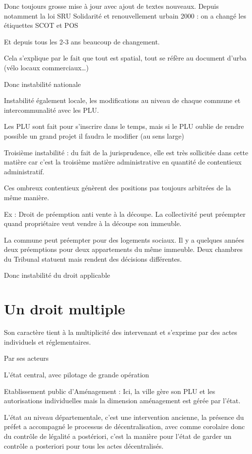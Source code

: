 		Donc toujours grosse mise à jour avec ajout de textes nouveaux. Depuis notamment la loi SRU Solidarité et renouvellement urbain 2000 : on a changé les étiquettes SCOT et POS

		Et depuis tous les 2-3 ans beaucoup de changement.

		Cela s’explique par le fait que tout est spatial, tout se réfère au document d’urba (vélo locaux commerciaux…)

		Donc instabilité nationale

		Instabilité également locale, les modifications au niveau de chaque commune et intercommunalité avec les PLU.

		Les PLU sont fait pour s’inscrire dans le temps, mais si le PLU oublie de rendre possible un grand projet il faudra le modifier (au sens large)

		Troisième instabilité : du fait de la jurisprudence, elle est très sollicitée dans cette matière car c’est la troisième matière administrative en quantité de contentieux administratif.

		Ces ombreux contentieux génèrent des positions pas toujours arbitrées de la même manière.

		Ex : Droit de préemption anti vente à la découpe. La collectivité peut préempter quand propriétaire veut vendre à la découpe son immeuble.

		La commune peut préempter pour des logements sociaux. Il y a quelques années deux préemptions pour deux appartements du même immeuble. Deux chambres du Tribunal statuent mais rendent des décisions différentes.

		Donc instabilité du droit applicable



	\section{Un droit multiple}

		Son caractère tient à la multiplicité des intervenant et s'exprime par des actes individuels et réglementaires.

		Par ses acteurs

		L’état central, avec pilotage de grande opération

		Etablissement public d’Aménagement : Ici, la ville gère son PLU et les autorisations individuelles mais la dimension aménagement est gérée par l’état.

		L’état au niveau départementale, c’est une intervention ancienne, la présence du préfet a accompagné le processus de décentralisation, avec comme corolaire donc du contrôle de légalité a postériori, c’est la manière pour l’état de garder un contrôle a posteriori pour tous les actes décentralisés.

